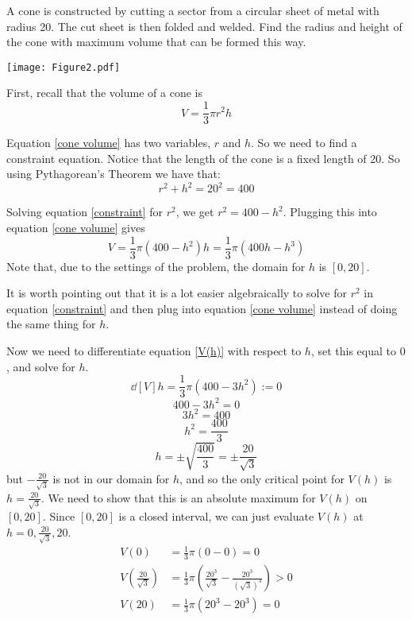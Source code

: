 \documentclass[nooutcomes]{ximera}
\begin{document}
\begin{problem}
A cone is constructed by cutting a sector from a circular sheet of metal with radius 20.  The cut sheet is then folded and welded.  Find the radius and height of the cone with maximum volume that can be formed this way.

	\begin{image}
	\texttt{[image: Figure2.pdf]}
	\end{image}
	
		\begin{freeResponse}
		First, recall that the volume of a cone is
		\begin{equation}\label{cone volume}
		V = \frac{1}{3} \pi r^2 h
		\end{equation}
		
		Equation \eqref{cone volume} has two variables, $r$ and $h$.  
		So we need to find a constraint equation.  
		Notice that the length of the cone is a fixed length of 20.  
		So using Pythagorean's Theorem we have that:
		\begin{equation}\label{constraint}
		r^2 + h^2 = 20^2 = 400
		\end{equation}
		
		Solving equation \eqref{constraint} for $r^2$, we get $r^2 = 400 - h^2$.  
		Plugging this into equation \eqref{cone volume} gives
		\begin{equation}\label{V(h)}
		V = \frac{1}{3} \pi (400-h^2) h = \frac{1}{3} \pi (400h - h^3) 
		\end{equation}
		Note that, due to the settings of the problem, the domain for $h$ is $[0,20]$.  
		
		It is worth pointing out that it is a lot easier algebraically to solve for $r^2$ in equation \eqref{constraint} 
		and then plug into equation \eqref{cone volume} instead of doing the same thing for $h$.
		
		Now we need to differentiate equation \eqref{V(h)} with respect to $h$, set this equal to $0$, and solve for $h$.
		$$ \dd[V]{h} = \frac{1}{3} \pi (400 - 3h^2) := 0 $$
		$$ 400 - 3h^2 = 0 $$
		$$ 3h^2 = 400 $$
		$$ h^2 = \frac{400}{3} $$
		$$ h = \pm \sqrt{\frac{400}{3}} = \pm \frac{20}{\sqrt{3}} $$
		but $- \frac{20}{\sqrt{3}}$ is not in our domain for $h$, and so the only critical point for $V(h)$ is $h = \frac{20}{\sqrt{3}}$.  
		We need to show that this is an absolute maximum for $V(h)$ on $[0,20]$.  
		Since $[0,20]$ is a closed interval, we can just evaluate $V(h)$ at $h=0, \frac{20}{\sqrt{3}}, 20$.  
		\begin{align}
		V(0) &= \frac{1}{3} \pi (0-0) = 0 \\
		V \left( \frac{20}{\sqrt{3}} \right) &= \frac{1}{3} \pi \left( \frac{20^3}{\sqrt{3}} - \frac{20^3}{\left( \sqrt{3} \right)^3} \right) > 0 \label{inequality} \\
		V(20) &= \frac{1}{3} \pi (20^3 - 20^3) = 0 
		\end{align}
		

\end{freeResponse}
\end{problem}
\end{document}
